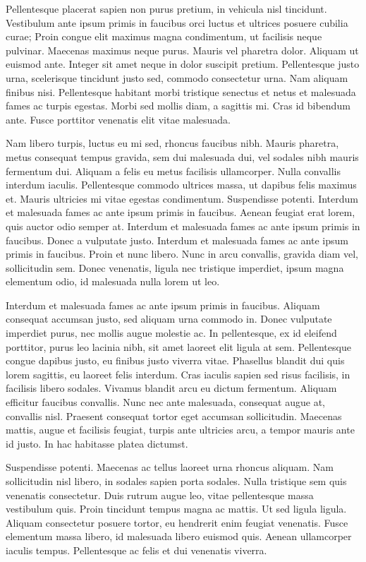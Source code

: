 Pellentesque placerat sapien non purus pretium, in vehicula nisl tincidunt. Vestibulum ante ipsum primis in faucibus orci luctus et ultrices posuere cubilia curae; Proin congue elit maximus magna condimentum, ut facilisis neque pulvinar. Maecenas maximus neque purus. Mauris vel pharetra dolor. Aliquam ut euismod ante. Integer sit amet neque in dolor suscipit pretium. Pellentesque justo urna, scelerisque tincidunt justo sed, commodo consectetur urna. Nam aliquam finibus nisi. Pellentesque habitant morbi tristique senectus et netus et malesuada fames ac turpis egestas. Morbi sed mollis diam, a sagittis mi. Cras id bibendum ante. Fusce porttitor venenatis elit vitae malesuada.

Nam libero turpis, luctus eu mi sed, rhoncus faucibus nibh. Mauris pharetra, metus consequat tempus gravida, sem dui malesuada dui, vel sodales nibh mauris fermentum dui. Aliquam a felis eu metus facilisis ullamcorper. Nulla convallis interdum iaculis. Pellentesque commodo ultrices massa, ut dapibus felis maximus et. Mauris ultricies mi vitae egestas condimentum. Suspendisse potenti. Interdum et malesuada fames ac ante ipsum primis in faucibus. Aenean feugiat erat lorem, quis auctor odio semper at. Interdum et malesuada fames ac ante ipsum primis in faucibus. Donec a vulputate justo. Interdum et malesuada fames ac ante ipsum primis in faucibus. Proin et nunc libero. Nunc in arcu convallis, gravida diam vel, sollicitudin sem. Donec venenatis, ligula nec tristique imperdiet, ipsum magna elementum odio, id malesuada nulla lorem ut leo.

Interdum et malesuada fames ac ante ipsum primis in faucibus. Aliquam consequat accumsan justo, sed aliquam urna commodo in. Donec vulputate imperdiet purus, nec mollis augue molestie ac. In pellentesque, ex id eleifend porttitor, purus leo lacinia nibh, sit amet laoreet elit ligula at sem. Pellentesque congue dapibus justo, eu finibus justo viverra vitae. Phasellus blandit dui quis lorem sagittis, eu laoreet felis interdum. Cras iaculis sapien sed risus facilisis, in facilisis libero sodales. Vivamus blandit arcu eu dictum fermentum. Aliquam efficitur faucibus convallis. Nunc nec ante malesuada, consequat augue at, convallis nisl. Praesent consequat tortor eget accumsan sollicitudin. Maecenas mattis, augue et facilisis feugiat, turpis ante ultricies arcu, a tempor mauris ante id justo. In hac habitasse platea dictumst.

Suspendisse potenti. Maecenas ac tellus laoreet urna rhoncus aliquam. Nam sollicitudin nisl libero, in sodales sapien porta sodales. Nulla tristique sem quis venenatis consectetur. Duis rutrum augue leo, vitae pellentesque massa vestibulum quis. Proin tincidunt tempus magna ac mattis. Ut sed ligula ligula. Aliquam consectetur posuere tortor, eu hendrerit enim feugiat venenatis. Fusce elementum massa libero, id malesuada libero euismod quis. Aenean ullamcorper iaculis tempus. Pellentesque ac felis et dui venenatis viverra.
